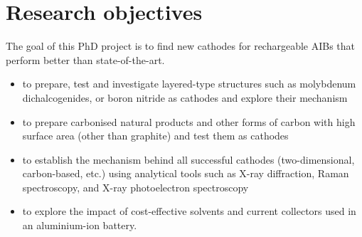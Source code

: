 \section{Research objectives}
The goal of this PhD project is to find new cathodes for rechargeable AIBs that perform better than state-of-the-art. 
\begin{itemize}

    \item to prepare, test and investigate layered-type structures such as molybdenum dichalcogenides, or boron nitride as cathodes and explore their mechanism
    \item to prepare carbonised natural products and other forms of carbon with high surface area (other than graphite) and test them as cathodes 
    \item to establish the mechanism behind all successful cathodes (two-dimensional, carbon-based, etc.) using analytical tools such as X-ray diffraction, Raman spectroscopy, and X-ray photoelectron spectroscopy
    \item to explore the impact of cost-effective solvents and current collectors used in an aluminium-ion battery. 
\end{itemize}






